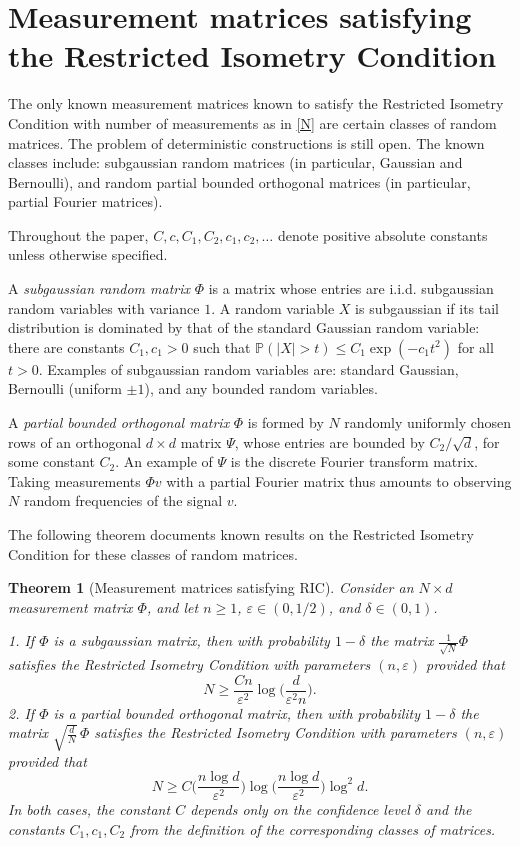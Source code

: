 \documentclass[12pt]{amsart}
\theoremstyle{plain}
\newtheorem{theorem}{Theorem}[section]
\theoremstyle{definition}
\theoremstyle{remark}
\numberwithin{equation}{section}
\begin{document}
\section{Measurement matrices satisfying the Restricted Isometry Condition} 
\label{s: ensembles}

The only known measurement matrices known to satisfy the Restricted Isometry
Condition with number of measurements as in \eqref{N} are certain classes
of random matrices. The problem of deterministic constructions is still open. 
The known classes include: subgaussian random matrices (in particular, Gaussian
and Bernoulli), and random partial bounded orthogonal matrices (in particular, partial 
Fourier matrices).

Throughout the paper, $C, c, C_1, C_2, c_1, c_2, \ldots$ denote positive 
absolute constants unless otherwise specified.

A {\em subgaussian random matrix} $\Phi$ is a matrix whose entries are i.i.d.
subgaussian random variables with variance $1$.
A random variable $X$ is subgaussian if its tail distribution is dominated by
that of the standard Gaussian random variable: there are constants $C_1, c_1 > 0$ such
that ${\mathbb{P}}(|X| > t) \le C_1 \exp(-c_1 t^2)$ for all $t > 0$.
Examples of subgaussian random variables are: standard Gaussian,
Bernoulli (uniform $\pm 1$), and any bounded random variables.

A {\em partial bounded orthogonal matrix} $\Phi$ is formed by $N$ randomly uniformly
chosen rows of an orthogonal $d \times d$ matrix $\Psi$, whose entries
are bounded by $C_2/\sqrt{d}$, for some constant $C_2$. An example of $\Psi$
is the discrete Fourier transform matrix.
Taking measurements $\Phi v$ with a partial Fourier matrix
thus amounts to observing $N$ random frequencies of the signal $v$.

The following theorem documents known results on the Restricted Isometry Condition
for these classes of random matrices. 

\begin{theorem}[Measurement matrices satisfying RIC]    \label{RIC matrices}
  Consider an $N \times d$ measurement matrix $\Phi$, and let $n \ge 1$,
  ${\varepsilon} \in (0,1/2)$, and ${\delta} \in (0,1)$.

  1. If $\Phi$ is a {\em subgaussian matrix}, then with probability $1-{\delta}$ the matrix
  $\frac{1}{\sqrt{N}} \Phi$ satisfies the Restricted
  Isometry Condition with parameters $(n,{\varepsilon})$ provided that
  $$
  N \ge \frac{Cn}{{\varepsilon}^2} \log \Big( \frac{d}{{\varepsilon}^2 n} \Big).
  $$
  2. If $\Phi$ is a {\em partial bounded orthogonal matrix},
  then with probability $1-{\delta}$ the matrix
  $\sqrt{\frac{d}{N}} \, \Phi$ satisfies the Restricted Isometry Condition
  with parameters $(n,{\varepsilon})$ provided that
  $$
  N \ge C \Big( \frac{n \log d}{{\varepsilon}^2} \Big)
  \log \Big( \frac{n \log d}{{\varepsilon}^2} \Big)
  \log^2 d.
  $$
  In both cases, the constant $C$ depends only on the confidence level 
  ${\delta}$ and the constants $C_1, c_1, C_2$ from the definition of the corresponding 
  classes of matrices.
\end{theorem}
\end{document}
